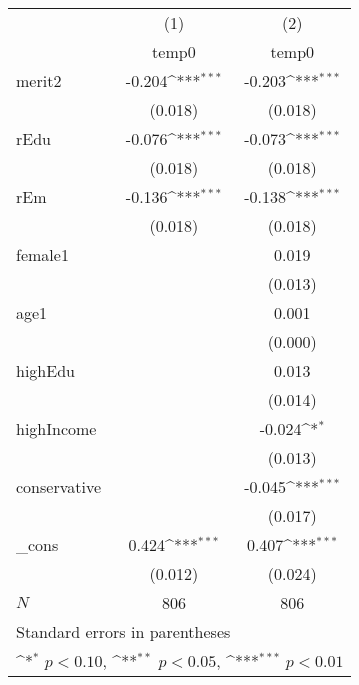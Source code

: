 {
\def\sym#1{\ifmmode^{#1}\else\(^{#1}\)\fi}
\begin{tabular}{l*{2}{c}}
\toprule
            &\multicolumn{1}{c}{(1)}&\multicolumn{1}{c}{(2)}\\
            &\multicolumn{1}{c}{temp0}&\multicolumn{1}{c}{temp0}\\
\midrule
merit2      &      -0.204\sym{***}&      -0.203\sym{***}\\
            &     (0.018)         &     (0.018)         \\
\addlinespace
rEdu        &      -0.076\sym{***}&      -0.073\sym{***}\\
            &     (0.018)         &     (0.018)         \\
\addlinespace
rEm         &      -0.136\sym{***}&      -0.138\sym{***}\\
            &     (0.018)         &     (0.018)         \\
\addlinespace
female1     &                     &       0.019         \\
            &                     &     (0.013)         \\
\addlinespace
age1        &                     &       0.001         \\
            &                     &     (0.000)         \\
\addlinespace
highEdu     &                     &       0.013         \\
            &                     &     (0.014)         \\
\addlinespace
highIncome  &                     &      -0.024\sym{*}  \\
            &                     &     (0.013)         \\
\addlinespace
conservative&                     &      -0.045\sym{***}\\
            &                     &     (0.017)         \\
\addlinespace
\_cons      &       0.424\sym{***}&       0.407\sym{***}\\
            &     (0.012)         &     (0.024)         \\
\midrule
\(N\)       &         806         &         806         \\
\bottomrule
\multicolumn{3}{l}{\footnotesize Standard errors in parentheses}\\
\multicolumn{3}{l}{\footnotesize \sym{*} \(p<0.10\), \sym{**} \(p<0.05\), \sym{***} \(p<0.01\)}\\
\end{tabular}
}
